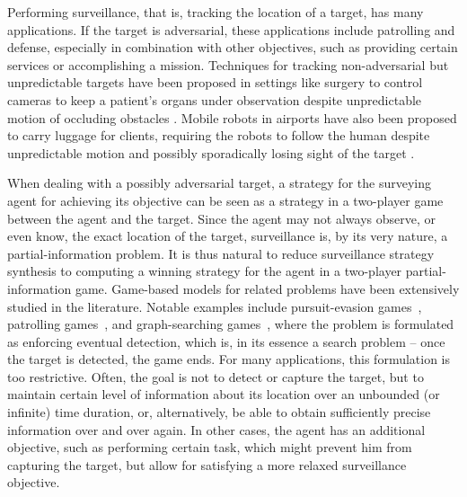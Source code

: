 
Performing surveillance, that is, tracking the location of a target, has many applications. If the target is adversarial, these applications include patrolling and defense, especially in combination with other objectives, such as providing certain services or accomplishing a mission. Techniques for tracking non-adversarial but unpredictable targets have been proposed in settings like surgery to control cameras to keep a patient's organs under observation despite unpredictable motion of occluding obstacles \cite{Bandyopadhyay2011}. Mobile robots in airports have also been proposed to carry luggage for clients, requiring the robots to follow the human despite unpredictable motion and possibly sporadically losing sight of the target \cite{GonBanos02}. 

When dealing with a possibly adversarial target, a strategy for the surveying agent for achieving its objective can be seen as a strategy in a two-player game between the agent and the target. Since the agent may not always observe, or even know, the exact location of the target, surveillance is, by its very nature, a partial-information problem.
It is thus natural to reduce surveillance strategy synthesis to computing a winning strategy for the agent in a two-player partial-information game. Game-based models for related problems have been extensively studied in the literature. Notable examples include pursuit-evasion games~\cite{Chung2011}, patrolling games~\cite{Basilico12}, and graph-searching games~\cite{Kreutzer11}, where the problem is formulated as enforcing eventual detection, which is, in its essence a search problem -- once the target is detected, the game ends. For many applications, this formulation is too restrictive. Often, the goal is not to detect or capture the target, but to maintain certain level of information about its location over an unbounded (or infinite) time duration, or, alternatively, be able to obtain sufficiently precise information over and over again. In other cases, the agent has an additional objective, such as performing certain task, which might prevent him from capturing the target, but allow for satisfying a more relaxed surveillance objective.

